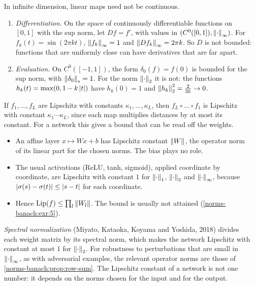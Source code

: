 \begin{notechapter}
\begin{example}\label{norms-banach:ex:unbounded}
In infinite dimension, linear maps need not be continuous.
\begin{enumerate}[nosep]
  \item \emph{Differentiation.} On the space of continuously
        differentiable functions on $[0, 1]$ with the sup norm, let
        $Df = f'$, with values in $(C^0([0, 1]), \left\|\cdot\right\|_\infty)$. For
        $f_k(t) = \sin(2\pi kt)$, $\left\|f_k\right\|_\infty = 1$ and
        $\left\|Df_k\right\|_\infty = 2\pi k$. So $D$ is not bounded: functions
        that are uniformly close can have derivatives that are far apart.
  \item \emph{Evaluation.} On $C^0([-1, 1])$, the form $\delta_0(f) = f(0)$
        is bounded for the sup norm, with $\left\|\delta_0\right\|_* = 1$. For the
        norm $\left\|\cdot\right\|_2$ it is not: the functions
        $h_k(t) = \max(0, 1 - k\left|t\right|)$ have $h_k(0) = 1$ and
        $\left\|h_k\right\|_2^2 = \frac2{3k}\to0$.
\end{enumerate}
\end{example}

\begin{mlthread}
If $f_1,\dots,f_L$ are Lipschitz with constants $\kappa_1,\dots,\kappa_L$,
then $f_L\circ\dots\circ f_1$ is Lipschitz with constant
$\kappa_1\cdots\kappa_L$, since each map multiplies distances by at most
its constant. For a network this gives a bound that can be read off the
weights.
\begin{itemize}[nosep]
  \item An affine layer $x\mapsto Wx + b$ has Lipschitz constant
        $\left\|W\right\|$, the operator norm of its linear part for the chosen
        norms. The bias plays no role.
  \item The usual activations (ReLU, tanh, sigmoid), applied coordinate by
        coordinate, are Lipschitz with constant $1$ for $\left\|\cdot\right\|_1$,
        $\left\|\cdot\right\|_2$ and $\left\|\cdot\right\|_\infty$, because
        $\left|\sigma(s) - \sigma(t)\right|\leq\left|s - t\right|$ for each coordinate.
  \item Hence $\mathrm{Lip}(f)\leq\prod_l\left\|W_l\right\|$. The bound is
        usually not attained (\cref{norms-banach:exr:5}).
\end{itemize}
\emph{Spectral normalization} (Miyato, Kataoka, Koyama and Yoshida, 2018)
divides each weight matrix by its spectral norm, which makes the network
Lipschitz with constant at most $1$ for $\left\|\cdot\right\|_2$. For robustness to
perturbations that are small in $\left\|\cdot\right\|_\infty$, as with adversarial
examples, the relevant operator norms are those of
\cref{norms-banach:prop:row-sum}. The Lipschitz constant of a network is
not one number: it depends on the norms chosen for the input and for the
output.
\end{mlthread}


\end{notechapter}

